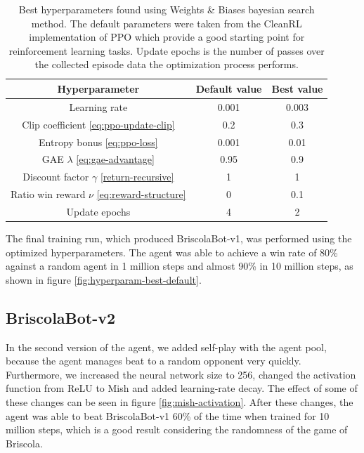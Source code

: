 \begin{table}[H]
    \centering
    \begin{tabular}{ccc}
        \hline
        Hyperparameter & Default value & Best value \\
        \hline
        Learning rate & 0.001 & 0.003 \\
        Clip coefficient \eqref{eq:ppo-update-clip} & 0.2 & 0.3\\
        Entropy bonus \eqref{eq:ppo-loss} & 0.001 & 0.01 \\
        GAE $\lambda$ \eqref{eq:gae-advantage} & 0.95 & 0.9 \\
        Discount factor $\gamma$ \eqref{return-recursive} & 1 & 1 \\
        Ratio win reward $\nu$ \eqref{eq:reward-structure} & 0 & 0.1 \\
        Update epochs & 4 & 2 \\
    \end{tabular}
    \caption{Best hyperparameters found using Weights \& Biases bayesian search method. The default parameters were taken from the CleanRL implementation of PPO \cite{huang2022cleanrl} which provide a good starting point for reinforcement learning tasks. Update epochs is the number of passes over the collected episode data the optimization process performs.}
    \label{tab:hyperparam-best}
\end{table}

The final training run, which produced BriscolaBot-v1, was performed using the optimized hyperparameters. The agent was able to achieve a win rate of 80\% against a random agent in 1 million steps and almost 90\% in 10 million steps, as shown in figure \ref{fig:hyperparam-best-default}.

\subsection{BriscolaBot-v2}
In the second version of the agent, we added self-play with the agent pool, because the agent manages beat to a random opponent very quickly. Furthermore, we increased the neural network size to 256, changed the activation function from ReLU to Mish \cite{misra2019mish} and added learning-rate decay. The effect of some of these changes can be seen in figure \ref{fig:mish-activation}. After these changes, the agent was able to beat BriscolaBot-v1 60\% of the time when trained for 10 million steps, which is a good result considering the randomness of the game of Briscola.

